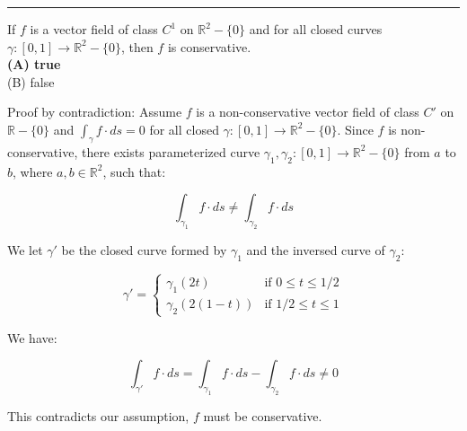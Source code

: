 \documentclass[a4paper,fontsize = 10pt]{article}
\def\R{\mathbb{R}}
\begin{document}
\vspace{0.1 cm}
\hrule
\vspace{0.2 cm}

If $f$ is a vector field of class $C^1$ on $\R^2 -\{0\}$ and for all closed curves $\gamma:[0,1] \to \R^2 - \{0\}$, then $f$ is conservative.
\\\textbf{(A) true}
\\(B) false 

\vspace{0.1cm}

Proof by contradiction: Assume $f$ is a non-conservative vector field of class $C'$ on $\mathbb{R} - \{0\}$ and $\displaystyle \int_{\gamma} f \cdot d s = 0$ for all closed $\gamma: [0, 1] \rightarrow\mathbb{R}^2 - \{0\}$. Since $f$ is non-conservative, there exists parameterized curve $\gamma_1, \gamma_2: [0, 1] \rightarrow\mathbb{R}^2 - \{0\}$ from $a$ to $b$, where $a, b \in \mathbb{R}^2$, such that:  

$$\displaystyle \int_{\gamma_1} f \cdot d s \neq \displaystyle \int_{\gamma_2} f \cdot d s$$  

We let $\gamma'$ be the closed curve formed by $\gamma_1$ and the inversed curve of $\gamma_2$:

$$\gamma' = \begin{cases}\gamma_1(2t) & \text{if } 0 \leq t \leq 1 / 2 \\ \gamma_2(2(1-t)) & \text{if } 1 / 2 \leq t \leq 1\end{cases}$$  

We have:  

$$\displaystyle \int_{\gamma'} f \cdot d s = \displaystyle \int_{\gamma_1} f \cdot d s - \displaystyle \int_{\gamma_2} f \cdot d s \neq 0$$

This contradicts our assumption, $f$ must be conservative.
\end{document}
